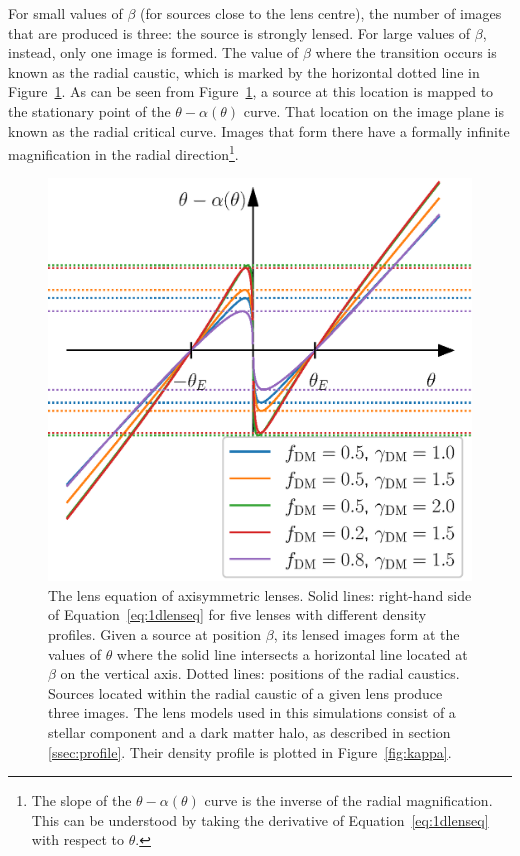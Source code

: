 \documentclass{aa}
\def\Fref#1{Figure~\ref{#1}\xspace}
\def\Eref#1{Equation~\ref{#1}\xspace}
\begin{document}
For small values of $\beta$ (for sources close to the lens centre), the number of images that are produced is three: the source is strongly lensed. For large values of $\beta$, instead, only one image is formed.
The value of $\beta$ where the transition occurs is known as the radial caustic, which is marked by the horizontal dotted line in \Fref{fig:scheme}. 
As can be seen from \Fref{fig:scheme}, a source at this location is mapped to the stationary point of the $\theta - \alpha(\theta)$ curve. 
That location on the image plane is known as the radial critical curve. 
Images that form there have a formally infinite magnification in the radial direction\footnote{The slope of the $\theta - \alpha(\theta)$ curve is the inverse of the radial magnification. This can be understood by taking the derivative of \Eref{eq:1dlenseq} with respect to $\theta$.}.

\begin{figure}
\includegraphics[width=\columnwidth]{composite_fixedap_scheme.eps}
\caption{
The lens equation of axisymmetric lenses. Solid lines: right-hand side of \Eref{eq:1dlenseq} for five lenses with different density profiles. 
Given a source at position $\beta$, its lensed images form at the values of $\theta$ where the solid line intersects a horizontal line located at $\beta$ on the vertical axis. 
Dotted lines: positions of the radial caustics. Sources located within the radial caustic of a given lens produce three images.
The lens models used in this simulations consist of a stellar component and a dark matter halo, as described in section \ref{ssec:profile}. Their density profile is plotted in \Fref{fig:kappa}.
\label{fig:scheme}
}
\end{figure}
\end{document}
